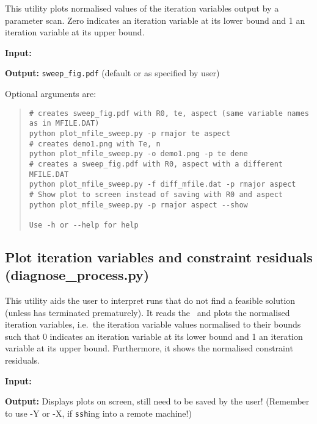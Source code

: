 This utility plots normalised values of the iteration variables output by a parameter scan. Zero indicates an iteration variable at its lower bound and 1 an iteration variable at its upper bound.

\begin{description}
\item{\textbf{Input:}}
 \mfile

\item{\textbf{Output:}}
\texttt{sweep\_fig.pdf} (default or as specified by user)
\end{description}

Optional arguments are:
\begin{quote}
\begin{verbatim}
# creates sweep_fig.pdf with R0, te, aspect (same variable names as in MFILE.DAT)
python plot_mfile_sweep.py -p rmajor te aspect
# creates demo1.png with Te, n
python plot_mfile_sweep.py -o demo1.png -p te dene
# creates a sweep_fig.pdf with R0, aspect with a different MFILE.DAT
python plot_mfile_sweep.py -f diff_mfile.dat -p rmajor aspect
# Show plot to screen instead of saving with R0 and aspect
python plot_mfile_sweep.py -p rmajor aspect --show

Use -h or --help for help

\end{verbatim}
\end{quote}

\subsection{Plot iteration variables and constraint residuals (diagnose\_process.py)}

This utility aids the user to interpret \process\/ runs that do not find a feasible solution (unless \process\/ has terminated prematurely). It reads the \mfile\ and plots
the normalised iteration variables, i.e.\ the iteration variable values
normalised to their bounds such that 0 indicates an iteration variable at its
lower bound and 1 an iteration variable at its upper bound. Furthermore, it
shows the normalised constraint residuals.

\begin{description}
\item{\textbf{Input:}}
 \mfile

\item{\textbf{Output:}}
  Displays plots on screen, still need to be saved by the user! (Remember to
  use -Y or -X, if \texttt{ssh}ing into a remote machine!)

\end{description}

